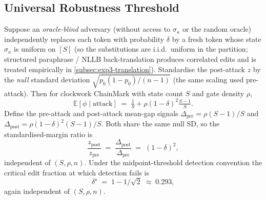 \subsection{Universal Robustness Threshold}
\label{subsec:proof-robustness}

\begin{theorem}
  \label{thm:robustness}
  Suppose an \emph{oracle-blind} adversary (without access to
  $\sigma_\kappa$ or the random oracle) independently replaces each
  token with probability $\delta$ by a fresh token whose state
  $\sigma_\kappa$ is uniform on $[S]$ (so the substitutions are
  i.i.d.\ uniform in the partition; structured paraphrase / NLLB
  back-translation produces correlated edits and is treated
  empirically in \autoref{subsec:exp3-translation}).  Standardise the post-attack
  $z$ by the \emph{null} standard deviation
  $\sqrt{p_0(1-p_0)/(n-1)}$ (the same scaling used pre-attack).
  Then for clockwork ChainMark with state count $S$ and gate density
  $\rho$,
  \begin{equation}
    \mathbb{E}[\phi \mid \mathrm{attack}]
      \;=\; \tfrac{1}{S} + \rho (1-\delta)^2 \tfrac{S-1}{S}.
    \label{eq:post-attack-mean}
  \end{equation}
  Define the pre-attack and post-attack mean-gap signals
  $\Delta_{\mathrm{pre}} = \rho (S{-}1)/S$ and
  $\Delta_{\mathrm{post}} = \rho(1{-}\delta)^2 (S{-}1)/S$.  Both share
  the same null SD, so the standardised-margin ratio is
  \begin{equation}
    \frac{z_{\mathrm{post}}}{z_{\mathrm{pre}}}
      \;=\; \frac{\Delta_{\mathrm{post}}}{\Delta_{\mathrm{pre}}}
      \;=\; (1-\delta)^2,
    \label{eq:z-ratio}
  \end{equation}
  independent of $(S, \rho, n)$.  Under the midpoint-threshold
  detection convention the critical edit fraction at which detection
  fails is
  \begin{equation}
    \delta^\star \;=\; 1 - 1/\sqrt{2} \;\approx\; 0.293,
  \end{equation}
  again independent of $(S, \rho, n)$.
\end{theorem}

